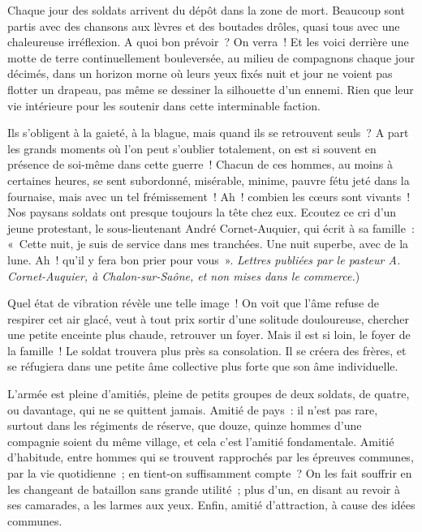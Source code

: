 \documentclass[french,twoside]{book} %
\newcommand\chaptercont{} %
\begin{document}
\chaptercont
\noindent Chaque jour des soldats arrivent du dépôt dans la zone de mort. Beaucoup sont partis avec des chansons aux lèvres et des boutades drôles, quasi tous avec une chaleureuse irréflexion. A quoi bon prévoir ? On verra ! Et les voici derrière une motte de terre continuellement bouleversée, au milieu de compagnons chaque jour décimés, dans un horizon morne où leurs yeux fixés nuit et jour ne voient pas flotter un drapeau, pas même se dessiner la silhouette d’un ennemi. Rien que leur vie intérieure pour les soutenir dans cette interminable faction.‌\par
Ils s’obligent à la gaieté, à la blague, mais quand ils se retrouvent seuls ? A part les grands moments où l’on peut s’oublier totalement, on est si souvent en présence de soi-même dans cette guerre ! Chacun de ces hommes, au moins à certaines heures, se sent subordonné, misérable, minime, pauvre fétu jeté dans la fournaise, mais avec un tel frémissement ! Ah ! combien les cœurs sont vivants ! Nos paysans soldats ont presque toujours la tête chez eux. Ecoutez ce cri d’un jeune protestant, le sous-lieutenant André Cornet-Auquier, qui écrit à sa famille : « Cette nuit, je suis de service dans mes tranchées. Une nuit superbe, avec de la lune. Ah ! qu’il y fera bon prier pour vous ». {\itshape Lettres publiées par le pasteur A. Cornet-Auquier, à Chalon-sur-Saône, et non mises dans le commerce.})\par
Quel état de vibration révèle une telle image ! On voit que l’âme refuse de respirer cet air glacé, veut à tout prix sortir d’une solitude douloureuse, chercher une petite enceinte plus chaude, retrouver un foyer. Mais il est si loin, le foyer de la famille ! Le soldat trouvera plus près sa consolation. Il se créera des frères, et se réfugiera dans une petite âme collective plus forte que son âme individuelle.‌\par
L’armée est pleine d’amitiés, pleine de petits groupes de deux soldats, de quatre, ou davantage, qui ne se quittent jamais. Amitié de pays : il n’est pas rare, surtout dans les régiments de réserve, que douze, quinze hommes d’une compagnie soient du même village, et cela c’est l’amitié fondamentale. Amitié d’habitude, entre hommes qui se trouvent rapprochés par les épreuves communes, par la vie quotidienne ; en tient-on suffisamment compte ? On les fait souffrir en les changeant de bataillon sans grande utilité ; plus d’un, en disant au revoir à ses camarades, a les larmes aux yeux. Enfin, amitié d’attraction, à cause des idées communes.‌\par
\end{document}
